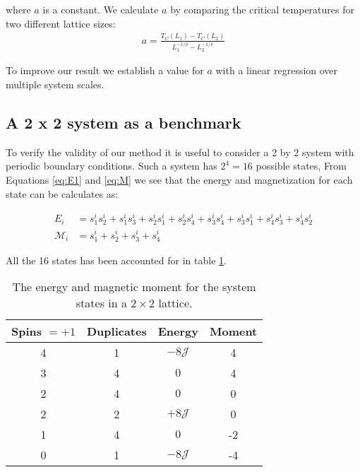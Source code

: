\documentclass[a4paper]{article}
\begin{document}
where  $a$ is a constant. We calculate $a$ by comparing the critical temperatures for two different lattice sizes:
\begin{align}\label{eq:scalingfactor}
  a = \frac{T_C(L_1) - T_C(L_2)}{L_1^{-1/\nu} - L_2^{-1/\nu}}
\end{align}

To improve our result we establish a value for $a$ with a linear regression over multiple system scales.


\subsection{A 2 x 2 system as a benchmark}
To verify the validity of our method it is useful to consider a 2 by 2 system with periodic boundary conditions. Such a system has $2^4=16$ possible states, From Equations \ref{eq:E1} and \ref{eq:M} we see that the energy and magnetization for each state can be calculates as:

\begin{align}
	E_i&=s_1^is_2^i+s_1^is_3^i+s_2^is_1^i+s_2^is_4^i+s_3^is_4^i+s_3^is_1^i+s_4^is_3^i+s_4^is_2^i \label{eq:E_2x2}\\
	\mathcal{M}_i&=s_1^i+s_2^i+s_3^i+s_4^i \label{eq:M_2x2}
\end{align}



All the 16 states has been accounted for in table \ref{tab:2x2}.

\begin{table}[H]
\begin{center}
  \begin{tabular}{| c | c | c | c |}
  	\hline
  	Spins $=+1$ & Duplicates & Energy & Moment \\[0.05cm] \hline\hline
     4 & 1 & $-8\mathcal{J}$ & 4\\[0.10cm]
     3 & 4 & $0$ & 4\\[0.10cm]
     2 & 4 & $0$ & 0\\[0.10cm]
     2 & 2 & $+8\mathcal{J}$ & 0\\[0.10cm]
     1 & 4 & $0$ & -2\\[0.10cm]
     0 & 1 & $-8\mathcal{J}$ & -4\\[0.10cm]
     \hline
  \end{tabular}
\end{center}
\caption{The energy and magnetic moment for the system states in a $2\times2$ lattice.}
\label{tab:2x2}
\end{table}
\end{document}
